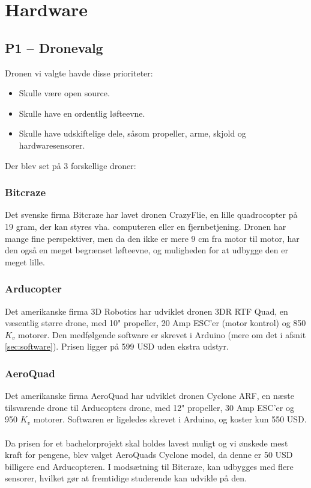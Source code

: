 \documentclass[Main]{subfiles}
\begin{document}
\chapter{Hardware}


\section[Dronevalg]{P1 -- Dronevalg}
Dronen vi valgte havde disse prioriteter:
\begin{itemize}
\item Skulle være open source.
\item Skulle have en ordentlig løfteevne.
\item Skulle have udskiftelige dele, såsom propeller, arme, skjold og hardwaresensorer.
\end{itemize}

Der blev set på 3 forskellige droner:
\subsection{Bitcraze}
Det svenske firma Bitcraze har lavet dronen CrazyFlie\cite{BitCraze}, en lille quadrocopter på 19 gram, der kan styres vha. computeren eller en fjernbetjening.
Dronen har mange fine perspektiver, men da den ikke er mere 9 cm fra motor til motor, har den også en meget begrænset løfteevne, og muligheden for at udbygge den er meget lille.

\subsection{Arducopter}
Det amerikanske firma 3D Robotics har udviklet dronen 3DR RTF Quad\cite{ArduCopter}, en væsentlig større drone, med 10"\xspace propeller, 20 Amp ESC'er (motor kontrol) og 850 $K_v$\cite{Kv} motorer.
Den medfølgende software er skrevet i Arduino (mere om det i afsnit \ref{sec:software}). 
Prisen ligger på 599 USD uden ekstra udstyr.

\subsection{AeroQuad}
Det amerikanske firma AeroQuad har udviklet dronen Cyclone ARF\cite{AQ-store}, en næste tilsvarende drone til Arducopters drone, med 12" propeller, 30 Amp ESC'er og 950 $K_v$\cite{Kv} motorer.
Softwaren er ligeledes skrevet i Arduino, og koster kun 550 USD.
\\
\\
Da prisen for et bachelorprojekt skal holdes lavest muligt og vi ønskede mest kraft for pengene, blev valget AeroQuads Cyclone model, da denne er 50 USD billigere end Arducopteren. I modsætning til Bitcraze, kan udbygges med flere sensorer, hvilket gør at fremtidige studerende kan udvikle på den.
\end{document}
